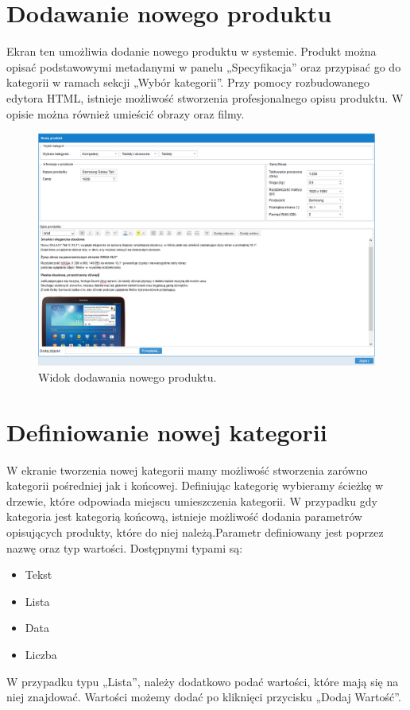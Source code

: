\newpage
\section{Dodawanie nowego produktu}

Ekran ten umożliwia dodanie nowego produktu w systemie. Produkt można opisać podstawowymi metadanymi w panelu „Specyfikacja” oraz przypisać go do kategorii w ramach sekcji „Wybór kategorii”. Przy pomocy rozbudowanego edytora HTML, istnieje możliwość stworzenia profesjonalnego opisu produktu. W opisie można również umieścić obrazy oraz filmy.

\begin{figure}[h]
	\centering
	\includegraphics[width=1.00\textwidth]{images/nowy_produkt.PNG}
	\caption{Widok dodawania nowego produktu.}
\end{figure}

\section{Definiowanie nowej kategorii}

W ekranie tworzenia nowej kategorii mamy możliwość stworzenia zarówno kategorii pośredniej jak i końcowej. Definiując kategorię wybieramy ścieżkę w drzewie, które odpowiada miejscu umieszczenia kategorii. W przypadku gdy kategoria jest kategorią końcową, istnieje możliwość dodania parametrów opisujących produkty, które do niej należą.Parametr definiowany jest poprzez nazwę oraz typ wartości. Dostępnymi typami są:
\begin{itemize}
\item Tekst
\item Lista
\item Data
\item Liczba
\end{itemize}
W przypadku typu „Lista”, należy dodatkowo podać wartości, które mają się na niej znajdować. Wartości  możemy dodać po kliknięci przycisku „Dodaj Wartość”.

